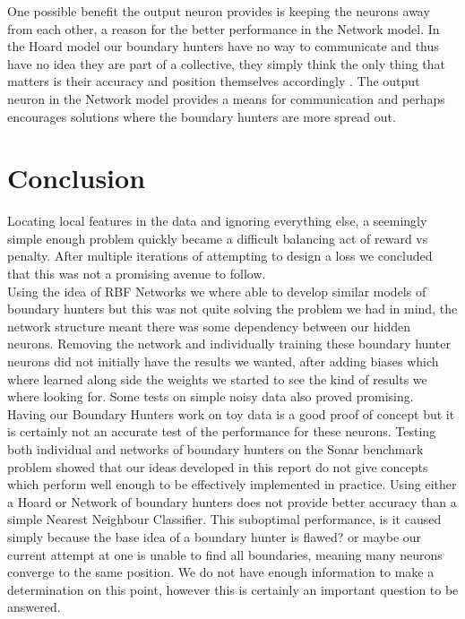 \documentclass[notitlepage]{report}
\theoremstyle{definition}
\begin{document}
One possible benefit the output neuron provides is keeping the neurons away from each other, a reason for the better performance in the Network model. In the Hoard model our boundary hunters have no way to communicate and thus have no idea they are part of a collective, they simply think the only thing that matters is their accuracy and position themselves accordingly . The output neuron in the Network model provides a means for communication and perhaps encourages solutions where the boundary hunters are more spread out.

\chapter{Conclusion}
Locating local features in the data and ignoring everything else, a seemingly simple enough problem quickly became a difficult  balancing act of reward vs penalty. After multiple iterations of attempting to design a loss we concluded that this was not a promising avenue to follow.\\

Using the idea of RBF Networks we where able to develop similar models of boundary hunters but this was not quite solving the problem we had in mind, the network structure meant there was some dependency between our hidden neurons. Removing the network and individually training these boundary hunter neurons did not initially have the results we wanted, after adding biases which where learned along side the weights we started to see the kind of results we where looking for. Some tests on simple noisy data also proved promising.\\

Having our Boundary Hunters work on toy data is a good proof of concept but it is certainly not an accurate test of the performance for these neurons. Testing both individual and networks of boundary hunters on the Sonar benchmark problem showed that our ideas developed in this report do not give concepts which perform well enough to be effectively implemented in practice. Using either a Hoard or Network of boundary hunters does not provide better accuracy than a simple Nearest Neighbour Classifier. This suboptimal performance, is it caused simply because the base idea of a boundary hunter is flawed? or maybe our current attempt at one is unable to find all boundaries, meaning many neurons converge to the same position. We do not have enough information to make a determination on this point, however this is certainly an important question to be answered.\\
\end{document}
